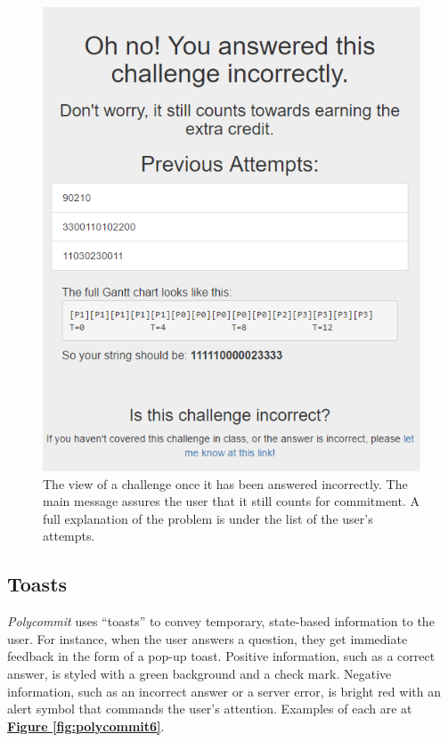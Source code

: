 \begin{figure}
	\includegraphics{figures/pc-incorrect}
	\caption{The view of a challenge once it has been answered incorrectly. The main message assures the user that it still counts for commitment. A full explanation of the problem is under the list of the user's attempts.}
	\label{fig:polycommit5}
\end{figure}

\subsection{Toasts}
\par \textit{Polycommit} uses ``toasts'' to convey temporary, state-based information to the user. For instance, when the user answers a question, they get immediate feedback in the form of a pop-up toast. Positive information, such as a correct answer, is styled with a green background and a check mark. Negative information, such as an incorrect answer or a server error, is bright red with an alert symbol that commands the user's attention. Examples of each are at \textbf{\hyperref[fig:polycommit6]{Figure \ref*{fig:polycommit6}}}.


